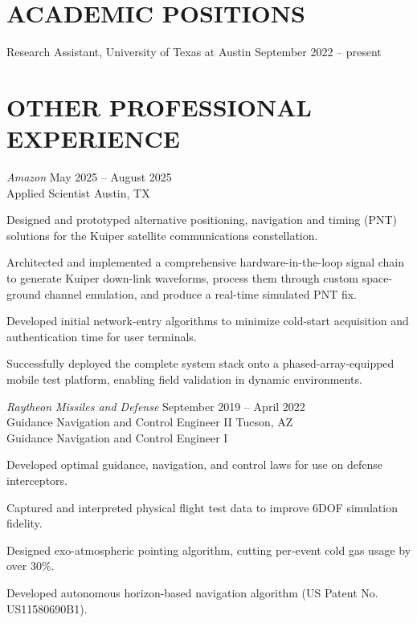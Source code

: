 \documentclass[]{res}
\newenvironment{list1}{
  \begin{list}{\ding{113}}{%
      \setlength{\itemsep}{0in}
      \setlength{\parsep}{0in} \setlength{\parskip}{0in}
      \setlength{\topsep}{0in} \setlength{\partopsep}{0in} 
      \setlength{\leftmargin}{0.17in}}}{\end{list}}
\begin{document}
\begin{resume}
\section{ACADEMIC POSITIONS}
\vspace{1mm}

Research Assistant, University of Texas at Austin \hfill {September 2022 -- present}

\section{OTHER PROFESSIONAL EXPERIENCE}

\emph{Amazon} \hfill {May 2025 -- August 2025} \\
Applied Scientist \hfill Austin, TX \\
\begin{list1}
\item[] Designed and prototyped alternative positioning, navigation and timing (PNT) solutions for the Kuiper satellite communications constellation.
\item[] Architected and implemented a comprehensive hardware-in-the-loop signal chain to generate Kuiper down-link waveforms, process them through custom space-ground channel emulation, and produce a real-time simulated PNT fix.
\item[] Developed initial network-entry algorithms to minimize cold-start acquisition and authentication time for user terminals.
\item[] Successfully deployed the complete system stack onto a phased-array-equipped mobile test platform, enabling field validation in dynamic environments.
\end{list1}

\emph{Raytheon Missiles and Defense} \hfill {September 2019 -- April 2022} \\
Guidance Navigation and Control Engineer II \hfill Tucson, AZ \\
Guidance Navigation and Control Engineer I\\
\begin{list1}
\item[] Developed optimal guidance, navigation, and control laws for use on defense interceptors.
\item[] Captured and interpreted physical flight test data to improve 6DOF simulation fidelity.
\item[] Designed exo-atmospheric pointing algorithm, cutting per-event cold gas usage by over 30\%.
\item[] Developed autonomous horizon-based navigation algorithm (US Patent No. US11580690B1).
\end{list1}


\end{resume}
\end{document}
